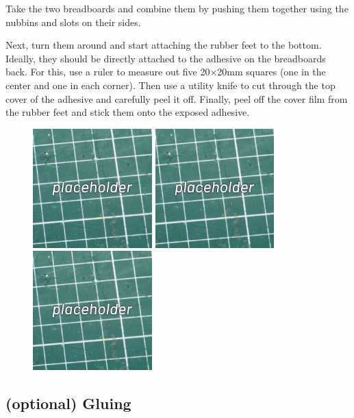 \documentclass[12pt, a4paper]{article}
\begin{document}
Take the two breadboards and combine them by pushing them together using the nubbins and slots
on their sides.

Next, turn them around and start attaching the rubber feet to the bottom. Ideally, they should
be directly attached to the adhesive on the breadboards back. For this, use a
ruler to measure out five 20×20mm squares (one in the center and one in each corner).
Then use a utility knife to cut through the top cover of the adhesive and carefully peel it
off. Finally, peel off the cover film from the rubber feet and stick them onto the exposed
adhesive.

\begin{figure}[H]
    \centering
    \includegraphics[width=46mm]{images/placeholder.jpg}
    \hspace{2mm}
    \includegraphics[width=46mm]{images/placeholder.jpg}
    \hspace{2mm}
    \includegraphics[width=46mm]{images/placeholder.jpg}
\end{figure}

\subsection{\smaller (optional) \enspace \larger Gluing}
\label{ssec:gluing}
\end{document}
